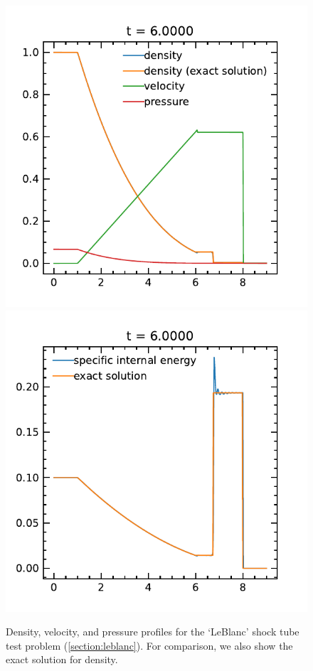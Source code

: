\documentclass[fleqn,usenatbib]{mnras}
\begin{document}
\begin{figure}
    \includegraphics[width=\columnwidth]{hydro_leblanc_6.0000.pdf}
    \includegraphics[width=\columnwidth]{hydro_leblanc_eint_6.0000.pdf}
    \caption{Density, velocity, and pressure profiles for the `LeBlanc' shock tube test problem (\autoref{section:leblanc}). For comparison, we also show the exact solution for density.}
    \label{fig:leblanc}
\end{figure}
\end{document}
